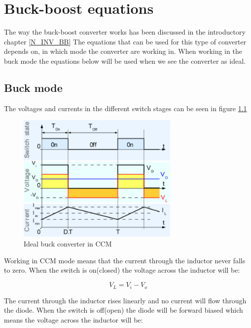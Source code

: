 \chapter{Buck-boost equations}\label{ch:Appbuckboost}

The way the buck-boost converter works has been discussed in the introductory chapter \ref{N_INV_BB} The equations that can be used for this type of converter depends on, in which mode the converter are working in. When working in the buck mode the equations below will be used when we see the converter as ideal. 

\section{Buck mode}

The voltages and currents in the different switch stages can be seen in figure \ref{CCM_buck} 

\begin{figure}[htbp]
	\begin{center}
		\includegraphics[width=0.7\textwidth]{../Pictures/CCM_buck}
		\caption{Ideal buck converter in CCM}
		\label{CCM_buck}
	\end{center}	
\end{figure}

Working in CCM mode means that the current through the inductor never falls to zero. When the switch is on(closed) the voltage across the inductor will be: 

\begin{equation}
V_L = V_i-V_o
\end{equation} 

The current through the inductor rises linearly and no current will flow through the diode.
When the switch is off(open) the diode will be forward biased which means the voltage across the inductor will be:

